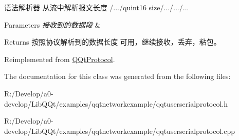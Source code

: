 语法解析器 从流中解析报文长度 /.../quint16 size/.../.../... 


\begin{DoxyParams}{Parameters}
{\em 接收到的数据段} & \\
\hline
\end{DoxyParams}
\begin{DoxyReturn}{Returns}
按照协议解析到的数据长度 可用，继续接收，丢弃，粘包。 
\end{DoxyReturn}


Reimplemented from \mbox{\hyperlink{class_q_qt_protocol_a00fd0c1ac23379ed3b9b25da9a34f39b}{Q\+Qt\+Protocol}}.



The documentation for this class was generated from the following files\+:\begin{DoxyCompactItemize}
\item 
R\+:/\+Develop/a0-\/develop/\+Lib\+Q\+Qt/examples/qqtnetworkexample/qqtuserserialprotocol.\+h\item 
R\+:/\+Develop/a0-\/develop/\+Lib\+Q\+Qt/examples/qqtnetworkexample/qqtuserserialprotocol.\+cpp\end{DoxyCompactItemize}

